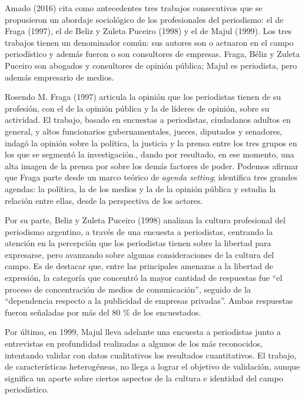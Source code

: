 Amado (2016) cita como antecedentes tres trabajos consecutivos que se propusieron un abordaje sociológico de los profesionales del periodismo: el de Fraga (1997), el de Beliz y Zuleta Puceiro (1998) y el de Majul (1999). Los tres trabajos tienen un denominador común: sus autores son o actuaron en el campo periodístico y además fueron o son consultores de empresas. Fraga, Béliz y Zuleta Puceiro son abogados y consultores de opinión pública; Majul es periodista, pero además empresario de medios.

Rosendo M. Fraga (1997) articula la opinión que los periodistas tienen de su profesión, con el de la opinión pública y la de líderes de opinión, sobre su actividad. El trabajo, basado en encuestas a periodistas, ciudadanos adultos en general, y altos funcionarios gubernamentales, jueces, diputados y senadores, indagó la opinión sobre la política, la justicia y la prensa entre los tres grupos en los que se segmentó la investigación., dando por resultado, en ese momento, una alta imagen de la prensa por sobre los demás factores de poder. Podemos afirmar que Fraga parte desde un marco teórico de \emph{agenda setting}; identifica tres grandes agendas: la política, la de los medios y la de la opinión pública y estudia la relación entre ellas, desde la perspectiva de los actores.

Por su parte, Beliz y Zuleta Puceiro (1998) analizan la cultura profesional del periodismo argentino, a través de una encuesta a periodistas, centrando la atención en la percepción que los periodistas tienen sobre la libertad para expresarse, pero avanzando sobre algunas consideraciones de la cultura del campo. Es de destacar que, entre las principales amenazas a la libertad de expresión, la categoría que concentró la mayor cantidad de respuestas fue ``el proceso de concentración de medios de comunicación'', seguido de la ``dependencia respecto a la publicidad de empresas privadas''. Ambas respuestas fueron señaladas por más del 80 \% de los encuestados.

Por último, en 1999, Majul lleva adelante una encuesta a periodistas junto a entrevistas en profundidad realizadas a algunos de los más reconocidos, intentando validar con datos cualitativos los resultados cuantitativos. El trabajo, de características heterogéneas, no llega a lograr el objetivo de validación, aunque significa un aporte sobre ciertos aspectos de la cultura e identidad del campo periodístico.

